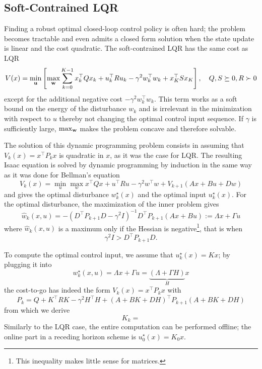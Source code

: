 \subsection{Soft-Contrained LQR}
\label{sec:soft-contrained-lqr}

Finding a robust optimal closed-loop control policy is often hard; the problem becomes tractable and even admits a closed form solution when the state update is linear and the cost quadratic. The soft-contrained LQR has the same cost as LQR
\begin{equation*}
  V(x) = \min_{\boldsymbol{\mathrm{u}}} \left[\max_{\boldsymbol{\mathrm{w}}} \sum_{k=0}^{K-1} x_k^\top Qx_k + u_k^\top R u_k - \gamma^2 w_k^\top w_k + x_K^\top Sx_K\right],\quad Q,S\succeq 0, R\succ 0
\end{equation*}
except for the additional negative cost $-\gamma^2 w_k^\top w_k$. This term works as a soft bound on the energy of the disturbance $w_k$ and is irrelevant in the minimization with respect to $u$ thereby not changing the optimal control input sequence. If $\gamma$ is sufficiently large, $\max_{\boldsymbol{\mathrm{w}}}$ makes the problem concave and therefore solvable.

The solution of this dynamic programming problem consists in assuming that $V_k(x) = x^\top P_kx$ is quadratic in $x$, as it was the case for LQR. The resulting Isaac equation is solved by dynamic programming by induction in the same way as it was done for Bellman's equation
\begin{equation*}
  V_k(x) = \min_u \max_w x^\top Qx + u^\top Ru - \gamma^2 w^\top w + V_{k+1}(Ax+Bu+Dw)
\end{equation*}
and gives the optimal disturbance $w_k^\star(x)$ and the optimal input $u_k^\star(x)$. For the optimal disturbance, the maximization of the inner problem gives
\begin{equation*}
  \hat{w}_k(x,u) = -(D^\top P_{k+1}D-\gamma^2I)^{-1}D^\top P_{k+1} (Ax+Bu) := \Lambda x + \Gamma u
\end{equation*}
where $\hat{w}_k(x,u)$ is a maximum only if the Hessian is negative\footnote{This inequality makes little sense for matrices.}, that is when
\begin{equation*}
  \gamma^2 I > D^\top P_{k+1}D.
\end{equation*}

To compute the optimal control input, we assume that $u_k^\star(x)=Kx$; by plugging it into
\begin{equation*}
  w_k^\star(x,u) = \Lambda x + \Gamma u = \underbrace{(\Lambda + \Gamma H)}_{H}x
\end{equation*}
the cost-to-go has indeed the form $V_k(x) = x^\top P_kx$ with
\begin{equation*}
  P_k = Q + K^\top RK -\gamma^2 H^\top H + (A+BK+DH)^\top P_{k+1}(A+BK+DH)
\end{equation*}
from which we derive
\begin{equation*}
  K_k =
\end{equation*}
Similarly to the LQR case, the entire computation can be performed offline; the online part in a receding horizon scheme is $u_0^\star(x) = K_0x$.

